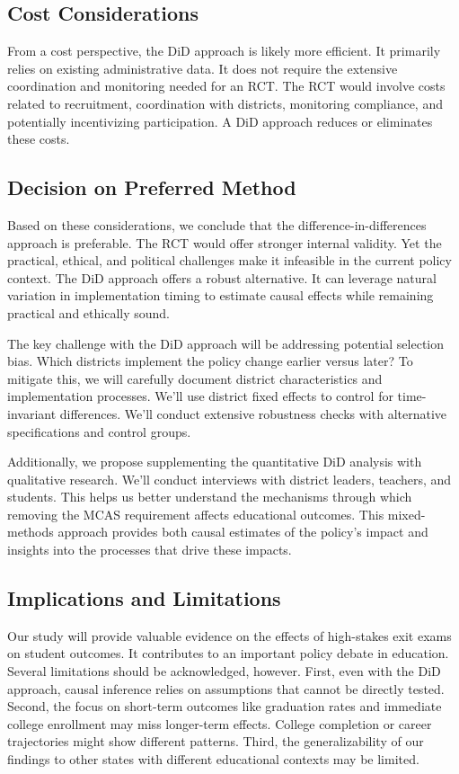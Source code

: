 \documentclass[12pt]{article}
\begin{document}
\subsection{Cost Considerations}

From a cost perspective, the DiD approach is likely more efficient. It primarily relies on existing administrative data. It does not require the extensive coordination and monitoring needed for an RCT. The RCT would involve costs related to recruitment, coordination with districts, monitoring compliance, and potentially incentivizing participation. A DiD approach reduces or eliminates these costs.

\subsection{Decision on Preferred Method}

Based on these considerations, we conclude that the difference-in-differences approach is preferable. The RCT would offer stronger internal validity. Yet the practical, ethical, and political challenges make it infeasible in the current policy context. The DiD approach offers a robust alternative. It can leverage natural variation in implementation timing to estimate causal effects while remaining practical and ethically sound.

The key challenge with the DiD approach will be addressing potential selection bias. Which districts implement the policy change earlier versus later? To mitigate this, we will carefully document district characteristics and implementation processes. We'll use district fixed effects to control for time-invariant differences. We'll conduct extensive robustness checks with alternative specifications and control groups.

Additionally, we propose supplementing the quantitative DiD analysis with qualitative research. We'll conduct interviews with district leaders, teachers, and students. This helps us better understand the mechanisms through which removing the MCAS requirement affects educational outcomes. This mixed-methods approach provides both causal estimates of the policy's impact and insights into the processes that drive these impacts.

\subsection{Implications and Limitations}

Our study will provide valuable evidence on the effects of high-stakes exit exams on student outcomes. It contributes to an important policy debate in education. Several limitations should be acknowledged, however. First, even with the DiD approach, causal inference relies on assumptions that cannot be directly tested. Second, the focus on short-term outcomes like graduation rates and immediate college enrollment may miss longer-term effects. College completion or career trajectories might show different patterns. Third, the generalizability of our findings to other states with different educational contexts may be limited.
\end{document}
